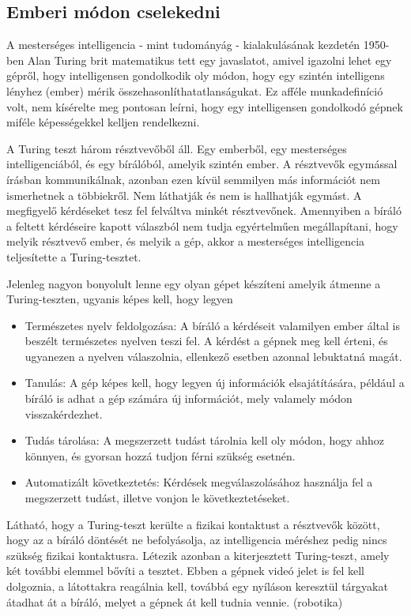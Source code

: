 \subsection{Emberi módon cselekedni}
A mesterséges intelligencia - mint tudományág - kialakulásának kezdetén 1950-ben Alan Turing brit matematikus tett egy javaslatot, amivel igazolni lehet egy gépről, hogy intelligensen gondolkodik oly módon, hogy egy szintén intelligens lényhez (ember) mérik összehasonlíthatatlanságukat. Ez afféle munkadefiníció volt, nem kísérelte meg pontosan leírni, hogy egy intelligensen gondolkodó gépnek miféle képességekkel kelljen rendelkezni.\ujsor

A Turing teszt három résztvevőből áll. Egy emberből, egy mesterséges intelligenciából, és egy bírálóból, amelyik szintén ember. A résztvevők egymással írásban kommunikálnak, azonban ezen kívül semmilyen más információt nem ismerhetnek a többiekről. Nem láthatják és nem is hallhatják egymást. A megfigyelő kérdéseket tesz fel felváltva minkét résztvevőnek. Amennyiben a bíráló a feltett kérdéseire kapott válaszból nem tudja egyértelműen megállapítani, hogy melyik résztvevő ember, és melyik a gép, akkor a mesterséges intelligencia teljesítette a Turing-tesztet.\ujsor

Jelenleg nagyon bonyolult lenne egy olyan gépet készíteni amelyik átmenne a \\Turing-teszten, ugyanis képes kell, hogy legyen
\begin{itemize}
	\item Természetes nyelv feldolgozása: A bíráló a kérdéseit valamilyen ember által is beszélt természetes nyelven teszi fel. A kérdést a gépnek meg kell érteni, és ugyanezen a nyelven válaszolnia, ellenkező esetben azonnal lebuktatná magát.
	\item Tanulás: A gép képes kell, hogy legyen új információk elsajátítására, például a bíráló is adhat a gép számára új információt, mely valamely módon visszakérdezhet.
	\item Tudás tárolása: A megszerzett tudást tárolnia kell oly módon, hogy ahhoz\\ könnyen, és gyorsan hozzá tudjon férni szükség esetnén.
	\item Automatizált következtetés: Kérdések megválaszolásához használja fel a megszerzett tudást, illetve vonjon le következtetéseket.
\end{itemize}

Látható, hogy a Turing-teszt kerülte a fizikai kontaktust a résztvevők között, hogy az a bíráló döntését ne befolyásolja, az intelligencia méréshez pedig nincs szükség fizikai kontaktusra. Létezik azonban a kiterjesztett Turing-teszt, amely két további elemmel bővíti a tesztet. Ebben a gépnek videó jelet is fel kell dolgoznia, a látottakra reagálnia kell, továbbá egy nyíláson keresztül tárgyakat átadhat át a bíráló, melyet a gépnek át kell tudnia vennie. (robotika)\ujsor

